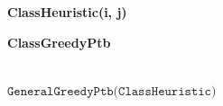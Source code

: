 \documentclass{article}
\begin{document}
\color{customcolor}

\noindent\textbf{ClassHeuristic(i, j)}
\begin{algorithmic}
\end{algorithmic}

\noindent\textbf{ClassGreedyPtb}
\begin{algorithmic}
\\$\texttt{GeneralGreedyPtb(ClassHeuristic)}$
\end{algorithmic}
\end{document}
